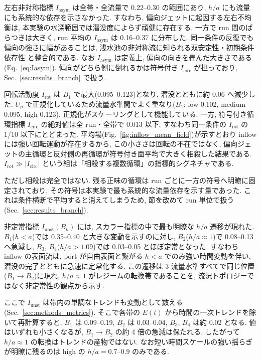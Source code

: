 左右非対称指標 $I_{\mathrm{asym}}$ は全帯・全流量で 0.22--0.30 の範囲にあり, $h/a$ にも流量にも系統的な依存を示さなかった. すなわち, 偏向ジェットに起因する左右不均衡は, 本実験の水深範囲では潜没度によらず頑健に存在する. 一方で run 間のばらつきは大きく, run 平均の $I_{\mathrm{asym}}$ は 0.16--0.37 に分布した. 同一条件の反復でも偏向の強さに幅があることは, 浅水池の非対称流に知られる双安定性・初期条件依存性 \cite{kantoushFLOWSHALLOWRECTANGULAR2008,dewalsExperimentalNumericalAnalysis2008} と整合的である. なお $I_{\mathrm{asym}}$ は定義上, 偏向の向きを畳んだ大きさである(Eq.~\eqref{eq:Iasym}). 偏向がどちら側に倒れるかは符号付き $I_{\mathrm{circ}}$ が担っており, Sec.~\ref{sec:results_branch} で扱う.

回転活動度 $I_{\mathrm{rot}}$ は $B_1$ で最大(0.095--0.123)となり, 潜没とともに約 0.06 へ減少した. $U_p$ で正規化しているため流量水準間でよく重なり($B_1$: low 0.102, medium 0.095, high 0.123), 正規化がスケーリングとして機能している. 一方, 符号付き循環指標 $I_{\mathrm{circ}}$ の絶対値は全 run・全帯で 0.013 以下, すなわち同一条件の $I_{\mathrm{rot}}$ の 1/10 以下にとどまった. 平均場(Fig.~\ref{fig:inflow_mean_field})が示すとおり inflow には強い回転運動が存在するから, この小ささは回転の不在ではなく, 偏向ジェットの主循環と反対側の再循環が符号付き面平均で大きく相殺した結果である. $I_{\mathrm{rot}} \gg |I_{\mathrm{circ}}|$ という組は「相殺する複数循環」の指標的シグネチャである.

ただし相殺は完全ではない. 残る正味の循環は run ごとに一方の符号へ明瞭に固定されており, その符号は本実験で最も系統的な流量依存を示す量であった. これは条件横断で平均すると消えてしまうため, 節を改めて run 単位で扱う(Sec.~\ref{sec:results_branch}).

非定常指標 $I_{\mathrm{unst}}(B_k)$ には, スカラー指標の中で最も明瞭な $h/a$ 遷移が現れた. $B_1$($h < a$)では 0.35--0.40 と大きな変動を示すのに対し, $B_2$($h/a \approx 1$)で 0.08--0.13 へ急減し, $B_3$, $B_4$($h/a > 1.09$)では 0.03--0.05 とほぼ定常となった. すなわち inflow の表面流は, port が自由表面と繋がる $h < a$ でのみ強い時間変動を伴い, 潜没の完了とともに急速に定常化する. この遷移は 3 流量水準すべてで同じ位置($B_1 \to B_2$)に現れ, $h/a \approx 1$ がレジームの転換帯であることを, 流況トポロジーではなく非定常性の観点から示す.

ここで $I_{\mathrm{unst}}$ は帯内の単調なトレンドも変動として数える(Sec.~\ref{sec:methods_metrics}). そこで各帯の $E(t)$ から時間の一次トレンドを除いて再計算すると, $B_1$ は 0.09--0.19, $B_2$ は 0.03--0.04, $B_3$, $B_4$ は約 0.02 となる. 値はいずれも小さくなるが, $B_1 \to B_2$ の約 4 倍の急減は保たれる. したがって $h/a \approx 1$ の転換はトレンドの産物ではない. なお短い時間スケールの強い揺らぎが明瞭に残るのは high の $h/a = 0.7$--$0.9$ のみである.

